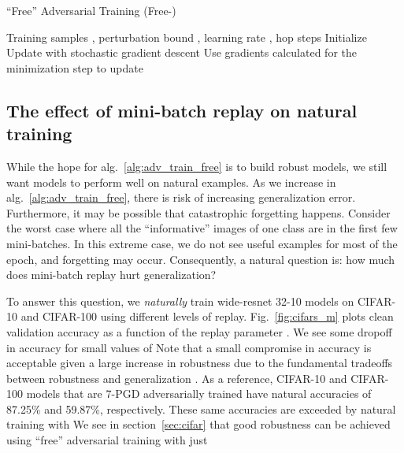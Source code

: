 \documentclass{article}
\begin{document}
\begin{algorithm}[t]
	\caption{
		``Free'' Adversarial Training (Free-)
	}
	\label{alg:adv_train_free}
	\begin{algorithmic}[1]
		\Require Training samples , perturbation bound , learning rate , hop steps 
		\State Initialize 
		\State 
		\State Update  with stochastic gradient descent
		\State \qquad  
		\State \qquad  
		\State \qquad  
		\State Use gradients calculated for the minimization step to update 
		\State \qquad 
		\State \qquad 
		\EndFor
		\EndFor
		\EndFor
	\end{algorithmic}
\end{algorithm}

\subsection*{The effect of mini-batch replay on natural training}\label{sec:increase_m}

While the hope for alg.~\ref{alg:adv_train_free} is to build robust models, we still want models to perform well on natural examples. As we increase  in alg.~\ref{alg:adv_train_free}, there is risk of increasing generalization error. 
Furthermore, it may be possible that catastrophic forgetting happens. Consider the worst case where all the ``informative'' images of one class are in the first few mini-batches. In this extreme case, we do not see useful examples for most of the epoch, and forgetting may occur. Consequently, a natural question is: how much does mini-batch replay hurt generalization? 

To answer this question, we {\em naturally} train wide-resnet 32-10 models on CIFAR-10 and CIFAR-100 using different levels of replay.  Fig.~\ref{fig:cifars_m} plots clean validation accuracy as a function of the replay parameter .
We see some dropoff in accuracy for small values of  Note that a small compromise in accuracy is acceptable given a large increase in robustness due to the fundamental tradeoffs between robustness and generalization \citep{tsipras2018robustness,zhang2019theoretically,shafahi2018adversarial}.  As a reference, CIFAR-10 and CIFAR-100 models that are 7-PGD adversarially trained have natural accuracies of 87.25\% and 59.87\%, respectively. These same accuracies are exceeded by natural training with   We see in section~\ref{sec:cifar} that good robustness can be achieved using ``free'' adversarial training with just 
\end{document}
